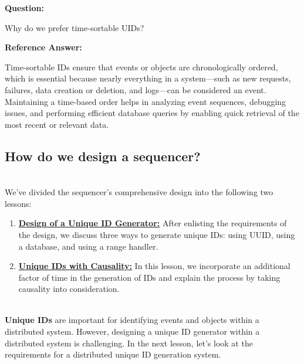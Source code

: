 \textbf{Question:}

Why do we prefer time-sortable UIDs?

\textbf{Reference Answer:}

Time-sortable IDs ensure that events or objects are chronologically ordered, which is essential because nearly everything in a system---such as new requests, failures, data creation or deletion, and logs---can be considered an event. Maintaining a time-based order helps in analyzing event sequences, debugging issues, and performing efficient database queries by enabling quick retrieval of the most recent or relevant data.

\subsection{How do we design a sequencer?}\label{XVObYuAQ_XJlsZK-ozI3j}
\\
We've divided the sequencer's comprehensive design into the following two lessons:

\begin{enumerate}
\item
\protect{}\label{U2eUeXg3Cl28hxBh8ZVS-}
\href{https://www.educative.io/courses/grokking-the-system-design-interview/design-of-a-unique-id-generator}{\textbf{Design of a Unique ID Generator:}} After enlisting the requirements of the design, we discuss three ways to generate unique IDs: using UUID, using a database, and using a range handler.
\item
\protect{}\label{F-gGB8IE4sdLQNEg9xGYX}
\href{https://www.educative.io/courses/grokking-the-system-design-interview/unique-ids-with-causality}{\textbf{Unique IDs with Causality:}} In this lesson, we incorporate an additional factor of time in the generation of IDs and explain the process by taking causality into consideration.
\end{enumerate}
\\
\textbf{Unique IDs} are important for identifying events and objects within a distributed system. However, designing a unique ID generator within a distributed system is challenging. In the next lesson, let's look at the requirements for a distributed unique ID generation system.

